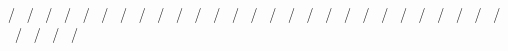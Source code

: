 /                                                                                 \
/                                                                                   \
/                                                                                 \
/                                                                                   \
/                                                                                 \
/                                                                                   \
/                                                                                 \
/                                                                                   \
/                                                                                 \
/                                                                                   \
/                                                                                 \
/                                                                                   \
/                                                                                 \
/                                                                                   \
/                                                                                 \
/                                                                                   \
/                                                                                 \
/                                                                                   \
/                                                                                 \
/                                                                                   \
/                                                                                 \
/                                                                                   \
/                                                                                 \
/                                                                                   \
/                                                                                 \
/                                                                                   \
/                                                                                 \
/                                                                                   \
/                                                                                 \
/                                                                                   \
/                                                                                 \
